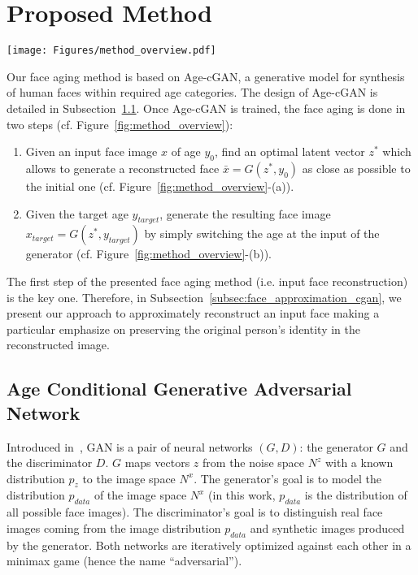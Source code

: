 \documentclass{article}
\begin{document}
\section{Proposed Method}
\label{sec:proposed_approach}

\begin{figure*}[t!]
	\begin{center}
			\texttt{[image: Figures/method\_overview.pdf]}
	\end{center}
	\caption{Our face aging method. (a) approximation of the latent vector to reconstruct the input image; (b) switching the age condition at the input of the generator $G$ to perform face aging.}
	\label{fig:method_overview}
\end{figure*}

Our face aging method is based on Age-cGAN, a generative model for synthesis of human faces within required age categories.
The design of Age-cGAN is detailed in Subsection~\ref{subsec:age_cgan}.
Once Age-cGAN is trained, the face aging is done in two steps (cf. Figure~\ref{fig:method_overview}):
\begin{enumerate}
	\item Given an input face image $x$ of age $y_{0}$, find an optimal latent vector $z^{*}$ which allows to generate a reconstructed face $\bar{x}=G(z^{*},y_{0})$ as close as possible to the initial one (cf. Figure~\ref{fig:method_overview}-(a)).
	\item Given the target age $y_{target}$, generate the resulting face image $x_{target}=G(z^{*},y_{target})$ by simply switching the age at the input of the generator (cf. Figure~\ref{fig:method_overview}-(b)).
\end{enumerate}
The first step of the presented face aging method (i.e. input face reconstruction) is the key one.
Therefore, in Subsection~\ref{subsec:face_approximation_cgan}, we present our approach to approximately reconstruct an input face making a particular emphasize on preserving the original person's identity in the reconstructed image.

\subsection{Age Conditional Generative Adversarial Network}
\label{subsec:age_cgan}

Introduced in~\cite{goodfellow2014generative}, GAN is a pair of neural networks $(G,D)$: the generator $G$ and the discriminator $D$.
$G$ maps vectors $z$ from the noise space $N^{z}$ with a known distribution $p_{z}$ to the image space $N^{x}$.
The generator's goal is to model the distribution $p_{data}$ of the image space $N^{x}$ (in this work, $p_{data}$ is the distribution of all possible face images).
The discriminator's goal is to distinguish real face images coming from the image distribution $p_{data}$ and synthetic images produced by the generator.
Both networks are iteratively optimized against each other in a minimax game (hence the name ``adversarial'').
\end{document}
